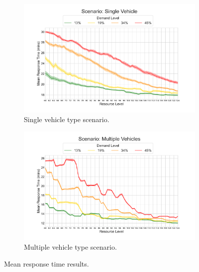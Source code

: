 \documentclass[preprint,12pt]{elsarticle}
\begin{document}
\begin{figure}
\begin{center}
\begin{subfigure}{0.48\textwidth}
\includegraphics[width=\textwidth]{img/results/single_MeanResponseTime}
\caption{Single vehicle type scenario.}
\label{fig:results_response_single}
\end{subfigure}
\begin{subfigure}{0.48\textwidth}
\includegraphics[width=\textwidth]{img/results/multiple_MeanResponseTime}
\caption{Multiple vehicle type scenario.}
\label{fig:results_response_multiple}
\end{subfigure}
\end{center}
\caption{Mean response time results.}
\end{figure}
\end{document}
